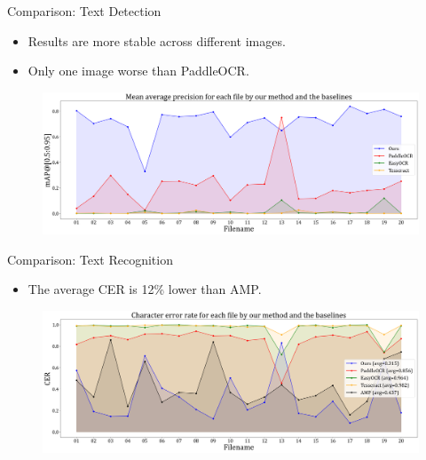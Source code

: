 \documentclass{beamer}
\begin{document}
\begin{frame}
    \begin{center}
        \Large{Comparison: Text Detection}
    \end{center}
    \begin{itemize}
        \item Results are more stable across different images.
        \item Only one image worse than PaddleOCR.
    \end{itemize}
    \begin{figure}
        \centering
        \includegraphics[width=\textwidth]{figures/comp_map2.png}
    \end{figure}
\end{frame}

\begin{frame}
    \begin{center}
        \Large{Comparison: Text Recognition}
    \end{center}
    \begin{itemize}
        \item The average CER is 12\% lower than AMP.
    \end{itemize}
    \begin{figure}
        \centering
        \includegraphics[width=\textwidth]{figures/comp_cer.png}
    \end{figure}
\end{frame}
\end{document}
